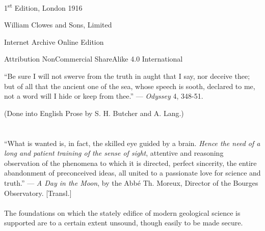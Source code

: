 \documentclass[a4paper, 12pt, oneside]{article}
\begin{document}
\begin{titlepage}
	
		
	\vspace*{\fill}%
	
	1\textsuperscript{st} Edition, London 1916 %
	
	{\small William Clowes and Sons, Limited } %

	\vspace{1\baselineskip} %

    Internet Archive Online Edition  %
	
	{\small Attribution NonCommercial ShareAlike 4.0 International } %
\end{titlepage}
\setlength{\parskip}{1mm plus1mm minus1mm}
\setcounter{tocdepth}{3}
\setcounter{secnumdepth}{3}
\pagestyle{fancy}
\fancyhf{}
\cfoot{\Fontauri{\thepage}}
\tableofcontents
\clearpage
\listoffigures{}
\clearpage
\vspace*{\fill}
\begin{displayquote}
``Be sure I will not swerve from the truth in aught that I say, nor deceive thee; but of all that the ancient one of the sea, whose speech is sooth, declared to me, not a word will I hide or keep from thee.'' --- \emph{Odyssey} 4, 348-51.

(Done into English Prose by S. H. Butcher and A. Lang.)
\end{displayquote}
\vspace*{\fill}
\clearpage
\Large
\section*{}
\begin{displayquote}
``What is wanted is, in fact, the skilled eye guided by a brain. \emph{Hence the need of a long and patient training of the sense of sight}, attentive and reasoning observation of the phenomena to which it is directed, perfect sincerity, the entire abandonment of preconceived ideas, all united to a passionate love for science and truth.'' --- \emph{A Day in the Moon}, by the Abbé Th. Moreux, Director of the Bourges Observatory. [Transl.]
\end{displayquote}
\paragraph{}
The foundations on which the stately edifice of modern geological science is supported are to a certain extent unsound, though easily to be made secure.
\end{document}
